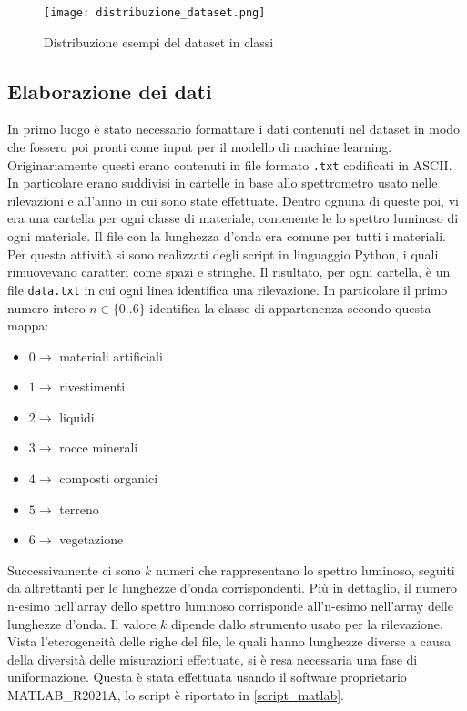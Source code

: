 \begin{figure}
    \centering
    \texttt{[image: distribuzione\_dataset.png]}
    \caption{Distribuzione esempi del dataset in classi}
    \label{distr_esempi}
\end{figure}

\subsection{Elaborazione dei dati}
In primo luogo è stato necessario formattare i dati contenuti nel dataset in modo che fossero poi pronti come input per il modello di machine learning. Originariamente questi erano contenuti in file formato \verb|.txt| codificati in ASCII. In particolare erano suddivisi in cartelle in base allo spettrometro usato nelle rilevazioni e all'anno in cui sono state effettuate. Dentro ognuna di queste poi, vi era una cartella per ogni classe di materiale, contenente le lo spettro luminoso di ogni materiale. Il file con la lunghezza d'onda era comune per tutti i materiali. Per questa attività si sono realizzati degli script in linguaggio Python, i quali rimuovevano caratteri come spazi e stringhe. Il risultato, per ogni cartella, è un file \verb|data.txt| in cui ogni linea identifica una rilevazione. In particolare il primo numero intero $n \in \{ 0 .. 6 \}$ identifica la classe di appartenenza secondo questa mappa:
\begin{itemize}
    \item $0 \rightarrow$ materiali artificiali
    \item $1 \rightarrow$ rivestimenti
    \item $2 \rightarrow$ liquidi
    \item $3 \rightarrow$ rocce minerali
    \item $4 \rightarrow$ composti organici
    \item $5 \rightarrow$ terreno
    \item $6 \rightarrow$ vegetazione
\end{itemize}
Successivamente ci sono $k$ numeri che rappresentano lo spettro luminoso, seguiti da altrettanti per le lunghezze d'onda corrispondenti. Più in dettaglio, il numero n-esimo nell'array dello spettro luminoso corrisponde all'n-esimo nell'array delle lunghezze d'onda. Il valore $k$ dipende dallo strumento usato per la rilevazione.\\
Vista l'eterogeneità delle righe del file, le quali hanno lunghezze diverse a causa della diversità delle misurazioni effettuate, si è resa necessaria una fase di uniformazione. Questa è stata effettuata usando il software proprietario MATLAB\_R2021A, lo script è riportato in \ref{script_matlab}.

